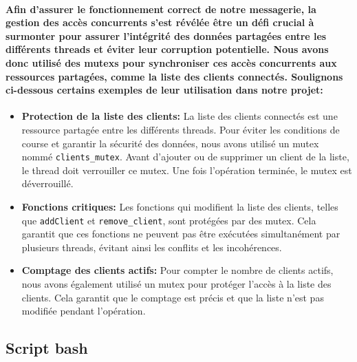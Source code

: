 \documentclass[utf8]{article}
\begin{document}
\paragraph{Afin d'assurer le fonctionnement correct de notre messagerie, la gestion des accès concurrents s'est révélée être un défi crucial à surmonter pour assurer 
l'intégrité des données partagées entre les différents threads et éviter leur corruption potentielle. Nous avons donc utilisé des mutexs pour synchroniser ces accès 
concurrents aux ressources partagées, comme la liste des clients connectés. Soulignons ci-dessous certains exemples de leur utilisation dans notre projet:}
\begin{itemize} %
    \item \textbf{Protection de la liste des clients:} La liste des clients connectés est une ressource partagée entre les différents threads. Pour éviter les conditions de course et garantir la sécurité des données, 
    nous avons utilisé un mutex nommé \texttt{clients\_mutex}. Avant d'ajouter ou de supprimer un client de la liste, le thread doit verrouiller ce mutex. Une fois l'opération terminée, le mutex est déverrouillé.
    \item \textbf{Fonctions critiques:} Les fonctions qui modifient la liste des clients, telles que \texttt{addClient} et \texttt{remove\_client}, sont protégées par des mutex. Cela garantit que ces fonctions ne peuvent pas être exécutées simultanément par plusieurs threads, évitant ainsi les conflits et les incohérences.
    \item \textbf{Comptage des clients actifs:} Pour compter le nombre de clients actifs, nous avons également utilisé un mutex pour protéger l'accès à la liste des clients. Cela garantit que le comptage est précis et que la liste n'est pas modifiée pendant l'opération.
\end{itemize}


\subsection{Script bash}
\end{document}
